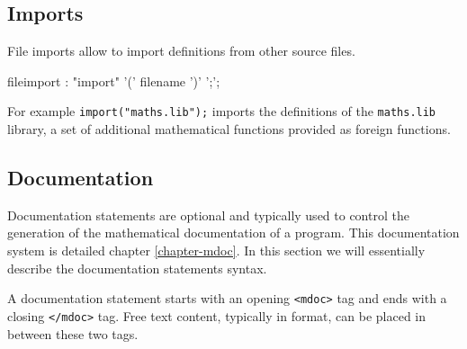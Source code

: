 \subsection{Imports}

File imports allow to import definitions from other source files.  


\begin{rail}
fileimport : "import" '(' filename ')' ';';
\end{rail}

For example \lstinline{import("maths.lib");} imports the definitions of the \lstinline{maths.lib} library, a set of additional mathematical functions provided as foreign functions.

\subsection{Documentation}
\label{sec-documentation}

Documentation statements are optional and typically used to control the generation of the mathematical documentation of a \faust program. This documentation system is detailed chapter \ref{chapter-mdoc}. In this section we will essentially describe the documentation statements syntax.

A documentation statement starts with an opening \lstinline'<mdoc>' tag and ends with a closing \lstinline'</mdoc>' tag. Free text content, typically in \latex format, can be placed in between these two tags. 


